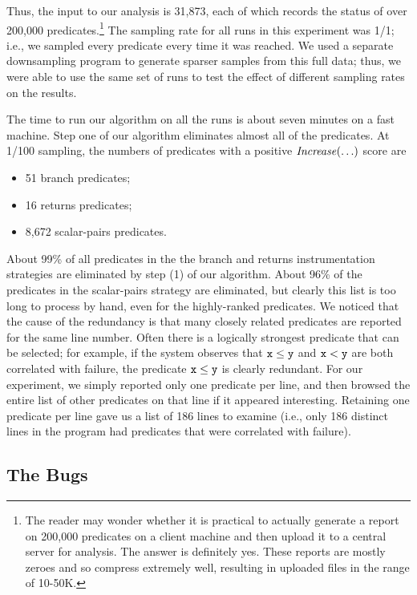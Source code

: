 Thus, the input to our analysis is 31,873, each of which records the
status of over 200,000 predicates.\footnote{The reader may wonder
whether it is practical to actually generate a report on 200,000
predicates on a client machine and then upload it to a central server
for analysis.  The answer is definitely yes.  These reports are mostly
zeroes and so compress extremely well, resulting in uploaded files in
the range of 10-50K.}  The sampling rate for all runs in this
experiment was 1/1; i.e., we sampled every predicate every time it was
reached.  We used a separate downsampling program to generate sparser
samples from this full data; thus, we were able to use the same set of
runs to test the effect of different sampling rates on the results.

The time to run our algorithm on all the runs is about seven minutes on
a fast machine.
Step one of our algorithm eliminates almost all of the predicates.  At
1/100 sampling, the numbers of predicates with a positive
$\mbox{\textit{Increase}}(\ldots)$ score are

\begin{itemize}
\item 51 branch predicates;

\item 16 returns predicates;

\item 8,672 scalar-pairs predicates.
\end{itemize}
About 99\% of all predicates in the the branch and returns
instrumentation strategies are eliminated by step (1) of our
algorithm.  About 96\% of the predicates in the scalar-pairs strategy are
eliminated, but clearly this list is too long to process by hand,
even for the highly-ranked predicates.  We noticed that the cause of the
redundancy is that many closely related predicates are reported for the
same line number.  Often there is a logically strongest predicate that can be
selected; for example, if the system observes that $\tt x \leq y$ and $\tt x < y$
are both correlated with failure, the predicate $\tt x \leq y$ is clearly redundant.  
For our experiment, we simply reported only one predicate per line,
and then browsed the entire list of other predicates on that line if it 
appeared interesting.  Retaining one predicate per line gave us a list
of 186 lines to examine (i.e., only 186 distinct lines in the program had
predicates that were correlated with failure).

\subsection{The Bugs}


